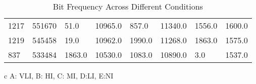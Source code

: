 \begin{table}[H]
\begin{threeparttable}
\begin{tabular}{p{1cm} p{2cm} p{1cm} p{2cm} p{1cm} p{2cm} p{1cm} p{2cm}}
			1217 & 551670 & 51.0   & 10965.0 & 857.0  & 11340.0 & 1556.0 & 1600.0  \\  
			1219 & 545458 & 19.0   & 10962.0 & 1990.0 & 11268.0 & 1863.0 & 1575.0  \\  
			837  & 533484 & 1863.0 & 10530.0 & 1083.0 & 10890.0 & 3.0    & 1537.0  \\  
			\hline
		\end{tabular}
		\vspace{-0.3cm}
		\begin{tablenotes}
			\item[c] A: VLI, B: HI, C: MI, D:LI, E:NI 
		\end{tablenotes}
	\end{threeparttable}
	\caption{Bit Frequency Across Different Conditions}
	\label{tab:bit_frequencies}
\end{table}
\FloatBarrier

